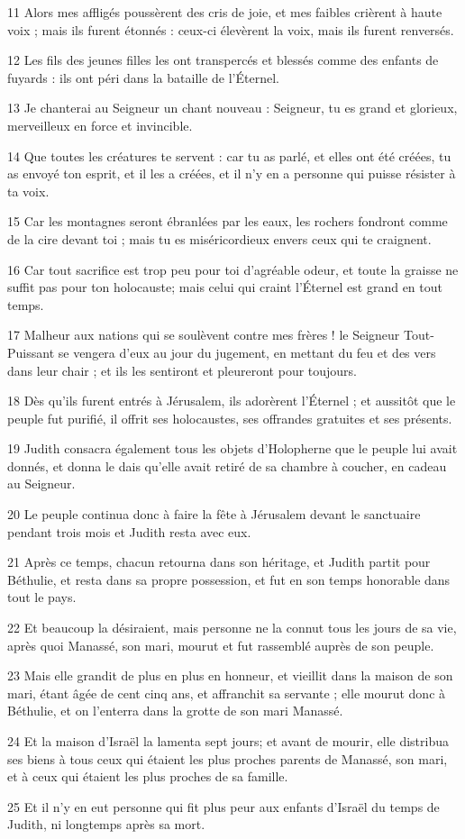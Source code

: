 \par 11 Alors mes affligés poussèrent des cris de joie, et mes faibles crièrent à haute voix ; mais ils furent étonnés : ceux-ci élevèrent la voix, mais ils furent renversés.
\par 12 Les fils des jeunes filles les ont transpercés et blessés comme des enfants de fuyards : ils ont péri dans la bataille de l'Éternel.
\par 13 Je chanterai au Seigneur un chant nouveau : Seigneur, tu es grand et glorieux, merveilleux en force et invincible.
\par 14 Que toutes les créatures te servent : car tu as parlé, et elles ont été créées, tu as envoyé ton esprit, et il les a créées, et il n'y en a personne qui puisse résister à ta voix.
\par 15 Car les montagnes seront ébranlées par les eaux, les rochers fondront comme de la cire devant toi ; mais tu es miséricordieux envers ceux qui te craignent.
\par 16 Car tout sacrifice est trop peu pour toi d'agréable odeur, et toute la graisse ne suffit pas pour ton holocauste; mais celui qui craint l'Éternel est grand en tout temps.
\par 17 Malheur aux nations qui se soulèvent contre mes frères ! le Seigneur Tout-Puissant se vengera d'eux au jour du jugement, en mettant du feu et des vers dans leur chair ; et ils les sentiront et pleureront pour toujours.
\par 18 Dès qu'ils furent entrés à Jérusalem, ils adorèrent l'Éternel ; et aussitôt que le peuple fut purifié, il offrit ses holocaustes, ses offrandes gratuites et ses présents.
\par 19 Judith consacra également tous les objets d'Holopherne que le peuple lui avait donnés, et donna le dais qu'elle avait retiré de sa chambre à coucher, en cadeau au Seigneur.
\par 20 Le peuple continua donc à faire la fête à Jérusalem devant le sanctuaire pendant trois mois et Judith resta avec eux.
\par 21 Après ce temps, chacun retourna dans son héritage, et Judith partit pour Béthulie, et resta dans sa propre possession, et fut en son temps honorable dans tout le pays.
\par 22 Et beaucoup la désiraient, mais personne ne la connut tous les jours de sa vie, après quoi Manassé, son mari, mourut et fut rassemblé auprès de son peuple.
\par 23 Mais elle grandit de plus en plus en honneur, et vieillit dans la maison de son mari, étant âgée de cent cinq ans, et affranchit sa servante ; elle mourut donc à Béthulie, et on l'enterra dans la grotte de son mari Manassé.
\par 24 Et la maison d'Israël la lamenta sept jours; et avant de mourir, elle distribua ses biens à tous ceux qui étaient les plus proches parents de Manassé, son mari, et à ceux qui étaient les plus proches de sa famille.
\par 25 Et il n'y en eut personne qui fit plus peur aux enfants d'Israël du temps de Judith, ni longtemps après sa mort.


